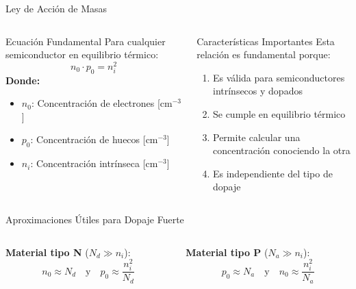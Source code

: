 \documentclass[
    10pt,
    aspectratio=169,
    xcolor={dvipsnames},
    spanish,
    ]{beamer}
\begin{document}
\begin{frame}{Ley de Acción de Masas}
\begin{columns}
  \begin{column}{0.48\textwidth}
    \begin{block}{Ecuación Fundamental}
      \footnotesize
      Para cualquier semiconductor en equilibrio térmico:
      \begin{equation}
        n_0 \cdot p_0 = n_i^2 \tag{Ley de Acción de Masas}
      \end{equation}
      \textbf{Donde:}
      \begin{itemize}
        \item $n_0$: Concentración de electrones [cm$^{-3}$]
        \item $p_0$: Concentración de huecos [cm$^{-3}$] 
        \item $n_i$: Concentración intrínseca [cm$^{-3}$]
      \end{itemize}
    \end{block}
  \end{column}
  
  \begin{column}{0.48\textwidth}
    \begin{block}{Características Importantes}
      \footnotesize
      Esta relación es fundamental porque:
      \begin{enumerate}
        \item Es válida para semiconductores intrínsecos y dopados
        \item Se cumple en equilibrio térmico
        \item Permite calcular una concentración conociendo la otra
        \item Es independiente del tipo de dopaje
      \end{enumerate}
    \end{block}
  \end{column}
\end{columns}

\begin{block}{Aproximaciones Útiles para Dopaje Fuerte}
  \footnotesize
  \begin{columns}
    \begin{column}{0.48\textwidth}
      \textbf{Material tipo N} ($N_d \gg n_i$):
      \begin{equation}
        n_0 \approx N_d \quad \text{y} \quad p_0 \approx \frac{n_i^2}{N_d}
      \end{equation}
    \end{column}

    \begin{column}{0.48\textwidth}
      \textbf{Material tipo P} ($N_a \gg n_i$):
      \begin{equation}
        p_0 \approx N_a \quad \text{y} \quad n_0 \approx \frac{n_i^2}{N_a}
      \end{equation}
    \end{column}
  \end{columns}
\end{block}
\end{frame}
\end{document}
